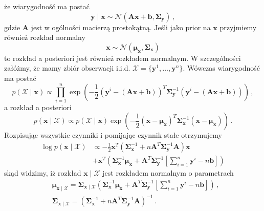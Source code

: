 \documentclass{myclass}
\numberwithin{equation}{subsection}
\begin{document}
że wiarygodność ma postać
\begin{equation}
    \mathbf{y} \mid \mathbf{x} \sim \mathcal{N}(\mathbf{A}\mathbf{x} + \mathbf{b}, \boldsymbol{\Sigma}_\mathbf{y})\,,
\end{equation}
gdzie \(\mathbf{A}\) jest w ogólności macierzą prostokątną. Jeśli jako prior na \(\mathbf{x}\)
przyjmiemy również rozkład normalny
\begin{equation}
    \mathbf{x} \sim \mathcal{N}(\boldsymbol{\mu}_\mathbf{x}, \boldsymbol{\Sigma}_\mathbf{x})
\end{equation}
to rozkład a posteriori jest również rozkładem normalnym. W szczególności załóżmy, że mamy zbiór
obserwacji i.i.d. \(\mathcal{X} = \{\mathbf{y}^1, \ldots, \mathbf{y}^n\}\). Wówczas wiarygodność ma
postać
\begin{equation}
    p(\mathcal{X} \mid \mathbf{x}) \propto \prod_{i=1}^n \exp\left(-\frac{1}{2}(\mathbf{y}^i - (\mathbf{Ax}+\mathbf{b}))^T\boldsymbol{\Sigma}_\mathbf{y}^{-1}(\mathbf{y}^i - (\mathbf{Ax}+\mathbf{b}))\right)\,,
\end{equation}
a rozkład a posteriori
\begin{equation}
    p(\mathbf{x} \mid \mathcal{X}) \propto p(\mathcal{X} \mid \mathbf{x}) \exp\left(-\frac{1}{2}(\mathbf{x} - \boldsymbol{\mu}_\mathbf{x})^T\boldsymbol{\Sigma}_\mathbf{x}^{-1}(\mathbf{x} - \boldsymbol{\mu}_\mathbf{x})\right)\,.
\end{equation}
Rozpisując wszystkie czynniki i pomijając czynnik stałe otrzymujemy
\begin{equation}
    \begin{split}
        \log p(\mathbf{x} \mid \mathcal{X}) &\propto -\frac{1}{2}\mathbf{x}^T\left(\boldsymbol{\Sigma}_\mathbf{x}^{-1} + n\mathbf{A}^T\boldsymbol{\Sigma}_\mathbf{y}^{-1}\mathbf{A}\right)\mathbf{x}\\
        & + \mathbf{x}^T\left(\boldsymbol{\Sigma}_\mathbf{x}^{-1}\boldsymbol{\mu}_\mathbf{x} + \mathbf{A}^T\boldsymbol{\Sigma}_\mathbf{y}^{-1}\left[\sum_{i=1}^n\mathbf{y}^i - n\mathbf{b}\right]\right)
    \end{split}
\end{equation}
skąd widzimy, iż rozkład \(\mathbf{x} \mid \mathcal{X}\) jest rozkładem normalnym o parametrach
\begin{equation}\label{eq:linear_gauss}\boxed{
    \begin{split}
        &\boldsymbol{\mu}_{\mathbf{x} \mid \mathcal{X}} = \boldsymbol{\Sigma}_{\mathbf{x} \mid \mathcal{X}} \left(\boldsymbol{\Sigma}_\mathbf{x}^{-1}\boldsymbol{\mu}_\mathbf{x} + \mathbf{A}^T\boldsymbol{\Sigma}_\mathbf{y}^{-1}\left[\sum_{i=1}^n\mathbf{y}^i - n\mathbf{b}\right]\right) \,,\\
        &\boldsymbol{\Sigma}_{\mathbf{x} \mid \mathcal{X}} = \left(\boldsymbol{\Sigma}_\mathbf{x}^{-1} + n\mathbf{A}^T\boldsymbol{\Sigma}_\mathbf{y}^{-1}\mathbf{A}\right)^{-1}\,.
    \end{split}
}\end{equation}
\end{document}
